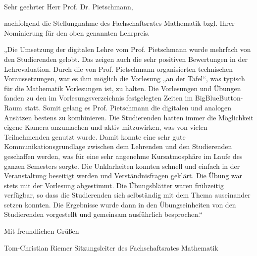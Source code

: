 \documentclass[nkz,einrichtung,usemycontact]{tucletter2019}
\begin{document}
	
\begin{letter}{%
\, \\
}

\opening{Sehr geehrter Herr Prof. Dr. Pietschmann,}

nachfolgend die Stellungnahme des Fachschaftsrates Mathematik bzgl. Ihrer Nominierung für den oben genannten Lehrpreis.

„Die Umsetzung der digitalen Lehre vom Prof. Pietschmann wurde mehrfach von den Studierenden gelobt. Das zeigen auch die sehr positiven Bewertungen in der Lehrevaluation. Durch die von Prof. Pietschmann organisierten technischen Voraussetzungen, war es ihm möglich die Vorlesung „an der Tafel“, was typisch für die Mathematik Vorlesungen ist, zu halten. Die Vorlesungen und Übungen fanden zu den im Vorlesungsverzeichnis festgelegten Zeiten im BigBlueButton-Raum statt. Somit gelang es Prof. Pietschmann die digitalen und analogen Ansätzen bestens zu kombinieren. Die Studierenden hatten immer die Möglichkeit eigene Kamera anzumachen und aktiv mitzuwirken, was von vielen Teilnehmenden genutzt wurde. Damit konnte eine sehr gute Kommunikationsgrundlage zwischen dem Lehrenden und den Studierenden geschaffen werden, was für eine sehr angenehme Kursatmosphäre im Laufe des ganzen Semesters sorgte. Die Unklarheiten konnten schnell und einfach in der Veranstaltung beseitigt werden und Verständnisfragen geklärt. Die Übung war stets mit der Vorlesung abgestimmt. Die Übungsblätter waren frühzeitig verfügbar, so dass die Studierenden sich selbständig mit dem Thema auseinander setzen konnten. Die Ergebnisse wurde dann in den Übungseinheiten von den Studierenden vorgestellt und gemeinsam ausführlich besprochen.“

Mit freundlichen Grüßen

Tom-Christian Riemer 
Sitzungsleiter des Fachschaftsrates Mathematik

\end{letter}
\end{document}

